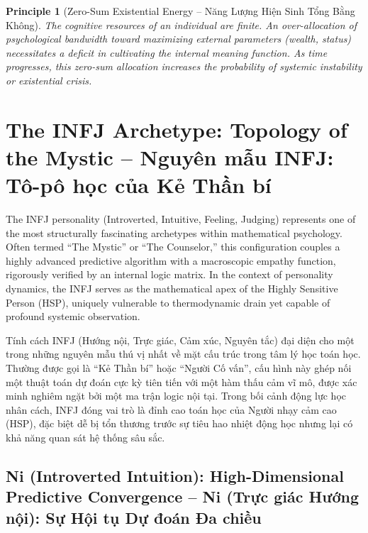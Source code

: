 \documentclass{report}
\newtheorem{principle}{Principle}
\begin{document}
\begin{principle}[Zero-Sum Existential Energy -- Năng Lượng Hiện Sinh Tổng Bằng Không]
    The cognitive resources of an individual are finite. An over-allocation of psychological bandwidth toward maximizing external parameters (wealth, status) necessitates a deficit in cultivating the internal meaning function. As time progresses, this zero-sum allocation increases the probability of systemic instability or existential crisis.
\end{principle}







\chapter{The INFJ Archetype: Topology of the Mystic -- Nguyên mẫu INFJ: Tô-pô học của Kẻ Thần bí}

The INFJ personality (Introverted, Intuitive, Feeling, Judging) represents one of the most structurally fascinating archetypes within mathematical psychology. Often termed ``The Mystic'' or ``The Counselor,'' this configuration couples a highly advanced predictive algorithm with a macroscopic empathy function, rigorously verified by an internal logic matrix. In the context of personality dynamics, the INFJ serves as the mathematical apex of the Highly Sensitive Person (HSP), uniquely vulnerable to thermodynamic drain yet capable of profound systemic observation.

Tính cách INFJ (Hướng nội, Trực giác, Cảm xúc, Nguyên tắc) đại diện cho một trong những nguyên mẫu thú vị nhất về mặt cấu trúc trong tâm lý học toán học. Thường được gọi là ``Kẻ Thần bí'' hoặc ``Người Cố vấn'', cấu hình này ghép nối một thuật toán dự đoán cực kỳ tiên tiến với một hàm thấu cảm vĩ mô, được xác minh nghiêm ngặt bởi một ma trận logic nội tại. Trong bối cảnh động lực học nhân cách, INFJ đóng vai trò là đỉnh cao toán học của Người nhạy cảm cao (HSP), đặc biệt dễ bị tổn thương trước sự tiêu hao nhiệt động học nhưng lại có khả năng quan sát hệ thống sâu sắc.

\section{Ni (Introverted Intuition): High-Dimensional Predictive Convergence -- Ni (Trực giác Hướng nội): Sự Hội tụ Dự đoán Đa chiều}
\end{document}
